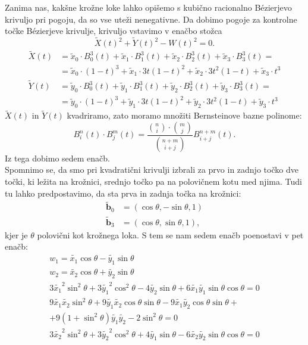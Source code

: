 \documentclass[a4paper,11pt]{article}
\theoremstyle{definition}
\theoremstyle{plain}
\begin{document}
Zanima nas, kakšne krožne loke lahko opišemo s kubično racionalno B\'ezierjevo krivuljo pri pogoju, da so vse uteži nenegativne. Da dobimo pogoje za kontrolne točke B\'ezierjeve krivulje, krivuljo vstavimo v enačbo stožca
$$ \tilde{X}(t)^2+\tilde{Y}(t)^2-W(t)^2=0.$$
\begin{align*}
\tilde{X}(t) &= \tilde{x}_0\cdot B_0^3(t)+\tilde{x}_1\cdot B_1^3(t)+ \tilde{x}_2\cdot B_2^3(t) + \tilde{x}_3\cdot B_3^3(t) = \\
&= \tilde{x}_0\cdot (1-t)^3+\tilde{x}_1\cdot3t(1-t)^2+\tilde{x}_2\cdot3t^2(1-t)+\tilde{x}_3\cdot t^3 \\
\tilde{Y}(t) &=\tilde{y}_0\cdot B_0^3(t)+\tilde{y}_1\cdot B_1^3(t)+\tilde{y}_2\cdot B_2^3(t) + \tilde{y}_3\cdot B_3^3(t) = \\
&= \tilde{y}_0\cdot (1-t)^3+\tilde{y}_1\cdot3t(1-t)^2+\tilde{y}_2\cdot3t^2(1-t)+\tilde{y}_3\cdot t^3 
\end{align*}
$\tilde{X}(t)$ in $\tilde{Y}(t)$ kvadriramo, zato moramo množiti Bernsteinove bazne polinome:
$$B_i^n(t)\cdot B_j^m(t)=\frac{\binom{n}{i} \cdot \binom{m}{j}}{\binom{n+m}{i+j}}B_{i+j}^{n+m}(t).$$
Iz tega dobimo sedem enačb.\\
Spomnimo se, da smo pri kvadratični krivulji izbrali za prvo in zadnjo točko dve točki, ki ležita na krožnici, srednjo točko pa na polovičnem kotu med njima. Tudi tu lahko predpostavimo, da sta prva in zadnja točka na krožnici:
\begin{align*}
\boldsymbol{\tilde{b}}_0 &= (\cos \theta, -\sin \theta, 1)\\
\boldsymbol{\tilde{b}}_3 &= (\cos \theta, \sin \theta, 1),
\end{align*}
kjer je $\theta$ polovični kot krožnega loka.  S tem se nam sedem enačb poenostavi v pet enačb:
\begin{align*}
w_1 = \tilde{x_1}\cos{\theta} - \tilde{y_1} \sin{\theta}   \\
w_2 = \tilde{x_2}\cos{\theta} + \tilde{y_2} \sin{\theta}   \\
3\tilde{x_1}^2\sin^2{\theta} + 3\tilde{y_1}^2\cos^2{\theta} - 4\tilde{y_2} \sin{\theta}  + 6\tilde{x_1}\tilde{y_1} \sin{\theta} \cos{\theta} = 0 \\
9\tilde{x_1}\tilde{x_2}\sin^2{\theta} + 9\tilde{y_1}\tilde{x_2}\cos{\theta} \sin{\theta} - 9\tilde{x_1} \tilde{y_2} \cos{\theta} \sin{\theta}+ \\
+ 9 (1 + \sin^2{\theta}) \tilde{y_1} \tilde{y_2} - 2\sin^2{\theta} = 0 \\
3\tilde{x_2}^2 \sin^2{\theta}+ 3\tilde{y_2}^2 \cos^2{\theta}+ 4\tilde{y_1} \sin{\theta}  - 6\tilde{x_2}\tilde{y_2}\sin{\theta} \cos{\theta}  = 0 
\end{align*}
\end{document}
